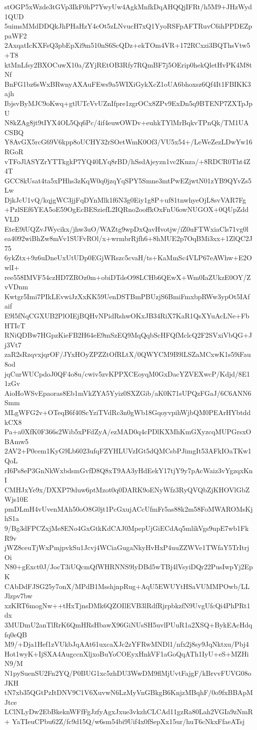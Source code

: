 stOGP5xWzde3tGVp3IkF0hP7YwyUw4AgkMnfkDqAHQQjIFRt/h5M9+JHzWyd1QUD
5uimsMMdDDQkJhPHaHzY4cOt5zLNvucH7xQ1YyoRSFpAFTRuvC6ihPPDEZppaWF2
2AxqatIcKXFsQ3pbEpXi9m510nS6ScQDz+ekTOm4VR+172RCxzi3BQThsVtw5+T8
ktMnLfsy2BXOCuwX10a/ZYjREtOB3Rfy7RQmBF7j5OErip0hekQletHvPK4M8tNf
BnFG1bz6sWxBRwnyAXAuFEws9a5WIXiGykXcZ1oUA6bhoxsz6Qf4It1FBIKK3ajh
IbjsvByMJC9oKwq+gtlUTcVvUZnIfpre1zgrOCx8ZPv9ExDn5q9BTENP7ZXTpJpU
N8kZAg8jt9tIYX4OL5Qq6Pc/4if4euwOWDv+euhkTYlMrBqkvTPnQk/TM1UACSBQ
Y8AvGX5rcG69V6kpp8oUCHY32rSOetWmK0Of3/VU5x54+/LeWeZezLDwYw16RGoR
vTFoJlASYZrYTTkgkP7YQ40LYq8rBD/hSsdAjeyzn1vc2Knza/+8RDCR0Tht4Z4T
GCC8kUsat4ta5xPHhs3zKqW0q0jzqYqSPY5Smne3mtPwEZjwtN01zYB9QYvZs5Lw
DjkJcU1vQ/kqjgWC3jjFqDYnMlk1f6N3g0Eiy1g8P+uf81tnwhyeOjL8svVAR7Fg
+PzlSEf6YEA5oE59OgEcBESziefL2IQRno2ooffkOxFnU6owNUGOX+0QUpZddVLD
EteE9iUQZvJWycikx/jhw3uO/WAZtg9wpDxQavHvotjw/iZ0uFTWxiaCls71vg0l
ea4092wiBhZw8mVv1SUFvROl/x+wrmbrRjfh6+8hMUE2p7OqBMi3xx+1ZlQC2J75
6ykZtx+9z6uDneUxUtUDp0EGjWRszc5cvaH/ts+KaMmSc4VLP67eAWhw+E2OwlI+
ree558IMVF54czHD7ZROz0m+obiDTdeO98LCHb6QEwX+Wm0IaZUkzE0OY/ZvVDnm
Kwtgr5Imi7PIkLEvwiJzXxKK59UenDSTBmPBUzjS6BmiFmxbpRWw3ypOt5IAfaif
E9l5fNqCGXUB2PlOIEjBQHvNPidRshwOKxJB34RiX7KaR1QsXYuAcLNe+FbHTIcT
RNiQDBw7HGpzKieFB2H64eE9mSzEQ9MqQqbScHFQfMclcQ2F2SVxiVbQG+Jj3Vt7
zaR2sRzqvxjqrOF/JYxHOyZPZZtOfRLtX/0QWYCM9B9lLSZaMCxwK1s59iFau8od
jqCurWUCpdoJ0QF4o8u/cwiv5zvKPPXCEoyqM0GxDacYZVEXwcP/Kdjd/8E11zGv
AioHoWSvEpaoras8Eb1mVkZYA5Yyiz0SXZGib/aK0K71sUPQzFGaJ/6C6ANN6Smm
MLgWFG2v+OTeqB6f40ScYziTVdRc3n0gWb18GqoyvpihWjbQM0PEArHYbtddkCX8
Pa+a0XfK0F366s2Wib5xPFdZyA/ezMAD0q4cPDlKXMhKmGXyzcqMUPGrsxOBAmw5
2AV2+P0cem1KyG9Lb6023ufqFZYHLUVzIGt5dQMCsbPJimgIt53AFkIOaTKw1QoL
rI6Ps8eP3GnNkWxbdsmGvfD8Q8xT9AA3yHdEekY17tjY9y7pAcWaiz3vYgzqxKnI
CMHJxYe9x/DXXP79duw6ptMzot0q0DARK9oENyWfz3RyQVQbZjKHOVlGbZWjs10E
pmDLmH4vUvenMAh50oO8G0jt1PcGxujACcUfmFr5as88k2m58FoMWAROMsKjhS1a
9/Bg3dFPCZxjMe8ENo4GxGtkKdCAJ0MpepUjGiECdAq5mlikVgs9upE7wb1FkR9v
jWZ8ceuTjWxPmjpvkSu1Jcvj4WCiaGugaNkyHvHxP4uuZZWVe1TWfaY5TrItrjOi
N80+gExct0J/JocT3iUQcmQfWHRNNS9lyDBd5wTBj4lVsyiDQr22PusIwpYj2EpK
CAbDdFJSG25y7onX/MPdB1MsshjnpRug+AqU5EWUYtHSaVUMMPOwb/LLJlzpv7bw
xzKRT6mogNw++tHxTjnsDMk6QZOIlEVB3lRdfRjrpbkzfN9UvgUfcQi4PhPRt1dx
3MUDmU2anTlRrK6QmHRsHbawX96GiNUsSH5uvlPUuR1a2XSQ+BykEAcHdqfq0eQB
M9/+Dja1Hef1zVUkbJqAAt61uxcaXJc2zYFRwMNDl1/nfx2j8sy9JqNktxu/Pbj4
Hot1wyK+IjSXA4AugccnXljxoBuYoCOEyxHnkVF1aGoQqATh1IyU+eS+MZHiN9/M
N1pySuenSU2Fn2YQ/P0BUG1xc5zhDU3WwDM9flMjUvtFajgF/kBrvvFUVG08oJKH
tN7xb35QGtPzItDNV9C1V6XuvwN6LzMyVnGBkgB6KnjzMBqhF/0o9fxBBApMJtce
LClNLyDw2EbBkeknWFfFgJzfyAgxJxue3vkzhCLCAd11gzRa80Lah2VGIa9zNmR+
YaTIeuCPbu62Z/fc9d15Q/w6sm54bi9Uif4x0fSepXx15ur/huT6cNkxFfaeATsj
